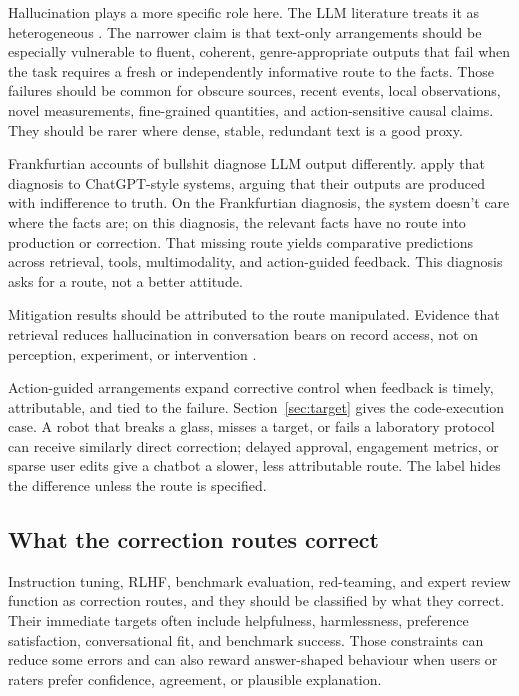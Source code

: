 \documentclass[12pt]{article}
\begin{document}
Hallucination plays a more specific role here. The LLM literature treats it as heterogeneous
\citep{huang_etal_2025_survey_hallucination_llms}. The narrower claim is that
text-only arrangements should be especially vulnerable to fluent, coherent, genre-appropriate
outputs that fail when the task requires a fresh or independently informative route to the facts.
Those failures should be common for obscure sources, recent events, local observations,
novel measurements, fine-grained quantities, and action-sensitive causal claims. They
should be rarer where dense, stable, redundant text is a good proxy.

Frankfurtian accounts of bullshit \citep{frankfurt_1986_on_bullshit} diagnose LLM output
differently. \textcite{hicks_humphries_slater_2024_chatgpt_bullshit} apply that diagnosis
to ChatGPT-style systems, arguing that their outputs are produced with indifference to
truth. On the Frankfurtian diagnosis, the system doesn't care where the facts are; on this
diagnosis, the relevant facts have no route into production or correction. That
missing route yields comparative predictions across retrieval, tools, multimodality, and
action-guided feedback. This diagnosis asks for a route, not a better attitude.

Mitigation results should be attributed to the route manipulated. Evidence that
retrieval reduces hallucination in conversation bears on record access, not on perception,
experiment, or intervention \citep{shuster2021retrieval}.

Action-guided arrangements expand corrective control when feedback is timely, attributable,
and tied to the failure. Section~\ref{sec:target} gives the code-execution case. A robot that
breaks a glass, misses a target, or fails a laboratory protocol can receive similarly direct
correction; delayed approval, engagement metrics, or sparse user edits give a chatbot a
slower, less attributable route. The label  hides the difference unless
the route is specified.

\subsection{What the correction routes correct}

Instruction tuning, RLHF, benchmark evaluation, red-teaming, and expert review function as
correction routes, and they should be classified by what they correct. Their immediate
targets often include helpfulness, harmlessness, preference satisfaction, conversational
fit, and benchmark success. Those constraints can reduce some errors and can also reward
answer-shaped behaviour when users or raters prefer confidence, agreement, or plausible
explanation.
\end{document}
